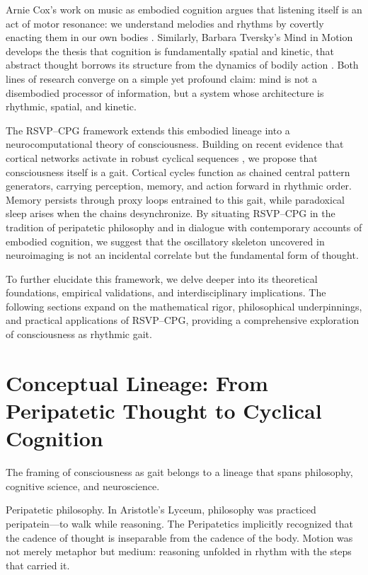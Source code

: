 \documentclass{article}
\begin{document}
Arnie Cox’s work on music as embodied cognition argues that listening itself is an act of motor resonance: we understand melodies and rhythms by covertly enacting them in our own bodies \citep{cox2016music}. Similarly, Barbara Tversky’s Mind in Motion develops the thesis that cognition is fundamentally spatial and kinetic, that abstract thought borrows its structure from the dynamics of bodily action \citep{tversky2019mind}. Both lines of research converge on a simple yet profound claim: mind is not a disembodied processor of information, but a system whose architecture is rhythmic, spatial, and kinetic.

The RSVP--CPG framework extends this embodied lineage into a neurocomputational theory of consciousness. Building on recent evidence that cortical networks activate in robust cyclical sequences \citep{van2025cortical}, we propose that consciousness itself is a gait. Cortical cycles function as chained central pattern generators, carrying perception, memory, and action forward in rhythmic order. Memory persists through proxy loops entrained to this gait, while paradoxical sleep arises when the chains desynchronize. By situating RSVP--CPG in the tradition of peripatetic philosophy and in dialogue with contemporary accounts of embodied cognition, we suggest that the oscillatory skeleton uncovered in neuroimaging is not an incidental correlate but the fundamental form of thought.

To further elucidate this framework, we delve deeper into its theoretical foundations, empirical validations, and interdisciplinary implications. The following sections expand on the mathematical rigor, philosophical underpinnings, and practical applications of RSVP--CPG, providing a comprehensive exploration of consciousness as rhythmic gait.

\section{Conceptual Lineage: From Peripatetic Thought to Cyclical Cognition}

The framing of consciousness as gait belongs to a lineage that spans philosophy, cognitive science, and neuroscience.

Peripatetic philosophy. In Aristotle’s Lyceum, philosophy was practiced peripatein—to walk while reasoning. The Peripatetics implicitly recognized that the cadence of thought is inseparable from the cadence of the body. Motion was not merely metaphor but medium: reasoning unfolded in rhythm with the steps that carried it.
\end{document}
